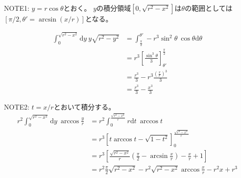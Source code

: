 NOTE1:
$y=r\cos \theta$とおく。
$y$の積分領域$[0, \sqrt{r^{2}-x^{2}}]$は$\theta$の範囲としては$[\pi/2, \theta' = \arcsin(x/r)]$となる。

\begin{align}
\int^{\sqrt{r^{2}-x^{2}}}_{0}\mathrm{d}y\ y\sqrt{r^{2}-y^{2}} &= \int^{\theta'}_{\frac{\pi}{2}}-r^{3}\sin^{2}\theta\ \cos\theta \mathrm{d}\theta\nonumber \\
&= r^{3}\left[ \frac{\sin^{3}\theta}{3} \right]^{\frac{\pi}{2}}_{\theta'}\nonumber \\
&= \frac{r^{3}}{3} - r^{3}\frac{\left( \frac{x}{r} \right)^{3}}{3}\nonumber \\
&= \frac{r^{3}}{3} - \frac{x^{3}}{3}
\end{align}

NOTE2:
$t = x/r$とおいて積分する。
\begin{align}
r^{2}\int^{\sqrt{r^{2}-x^{2}}}_{0}\mathrm{d}y\ \arccos \frac{y}{r} &= r^{2}\int^{\frac{\sqrt{r^{2}-x^{2}}}{r}}_{0}r\mathrm{d}t\ \arccos t\nonumber \\
&= r^{3}\left[ t\arccos t - \sqrt{1-t^{2}} \right]^{\frac{\sqrt{r^{2}-x^{2}}}{r}}_{0}\nonumber \\
&= r^{3}\left[ \frac{\sqrt{r^{2}-x^{2}}}{r}\left( \frac{\pi}{2} - \arcsin \frac{x}{r} \right) - \frac{x}{r} + 1 \right]\nonumber \\
&= r^{2}\frac{\pi}{2}\sqrt{r^{2}-x^{2}} - r^{2}\sqrt{r^{2}-x^{2}}\arccos\frac{x}{r} - r^{2}x + r^{3}
\end{align}
